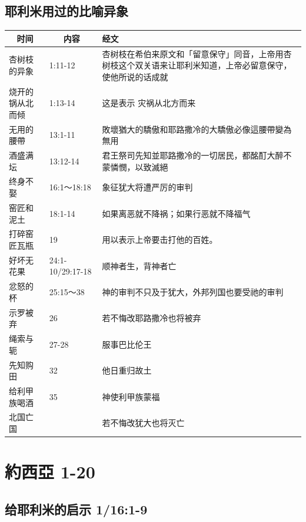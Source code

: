 \subsection{耶利米用过的比喻异象}
\begin{table}[H]
\centering
\begin{tabular}{p{3cm}|p{3.0cm}|p{11cm}}\hline\hline
\multicolumn{1}{c|}{时间}&\multicolumn{1}{c|}{内容}&经文\\\hline
杏树枝的异象&1:11-12&杏树枝在希伯来原文和「留意保守」同音，上帝用杏树枝这个双关语来让耶利米知道，上帝必留意保守，使他所说的话成就\\\hline
烧开的锅从北而倾& 1:13-14&这是表示 灾祸从北方而来\\\hline
无用的腰帶&13:1-11&敗壞猶大的驕傲和耶路撒冷的大驕傲必像這腰帶變為無用\\\hline
酒盛满坛&13:12-14&君王祭司先知並耶路撒冷的一切居民，都酩酊大醉不蒙憐憫，以致滅絕\\\hline
终身不娶&16:1～18:18&象征犹大将遭严厉的审判\\\hline
窑匠和泥土& 18:1-14&如果离恶就不降祸；如果行恶就不降福气\\\hline
打碎窑匠瓦瓶&19&用以表示上帝要击打他的百姓。\\\hline

好坏无花果&24:1-10/29:17-18&顺神者生，背神者亡\\\hline
忿怒的杯&25:15～38&神的审判不只及于犹大，外邦列国也要受祂的审判\\\hline
示罗被弃&26&若不悔改耶路撒冷也将被弃\\\hline
绳索与轭&27-28&服事巴比伦王\\\hline
先知购田&32&他日重归故土\\\hline
给利甲族喝酒&35&神使利甲族蒙福\\\hline
北国亡国&&若不悔改犹大也将灭亡\\\hline
\end{tabular}
\end{table}


\section{約西亞 1-20}
\subsection{给耶利米的启示 1/16:1-9}
